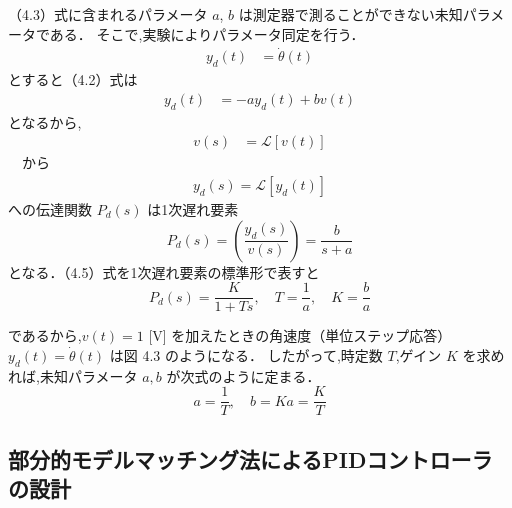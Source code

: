 （4.3）式に含まれるパラメータ $a$, $b$ は測定器で測ることができない未知パラメータである．
そこで,実験によりパラメータ同定を行う．
\begin{align}
  y_d(t) & = \dot{\theta}(t)
\end{align}とすると（4.2）式は    
\begin{align}                                                                    
  y_d(t) & = -a y_d(t) + b v(t) 
\end{align}となるから,    
\begin{align}                                                                             
  v(s) & = \mathcal{L}[v(t)]
\end{align}　から
\begin{align}  
  y_d(s) = \mathcal{L}[y_d(t)]
\end{align}への伝達関数 \(P_d(s)\) は1次遅れ要素
\begin{equation}
  P_d(s) = \left( \frac{y_d(s)}{v(s)} \right) = \frac{b}{s + a} \tag{4.5}
\end{equation}
となる．（4.5）式を1次遅れ要素の標準形で表すと
\begin{equation}
  P_d(s) = \frac{K}{1 + Ts}, \quad T = \frac{1}{a}, \quad K = \frac{b}{a} \tag{4.6}
\end{equation}

であるから,$v(t) = 1$ [V] を加えたときの角速度（単位ステップ応答） $y_d(t) = \dot{\theta}(t)$ は図 4.3 のようになる．
したがって,時定数 $T$,ゲイン $K$ を求めれば,未知パラメータ $a, b$ が次式のように定まる．
\begin{equation}
  a = \frac{1}{T}, \quad b = Ka = \frac{K}{T} \tag{4.7}
\end{equation}

\subsection{部分的モデルマッチング法によるPIDコントローラの設計}
